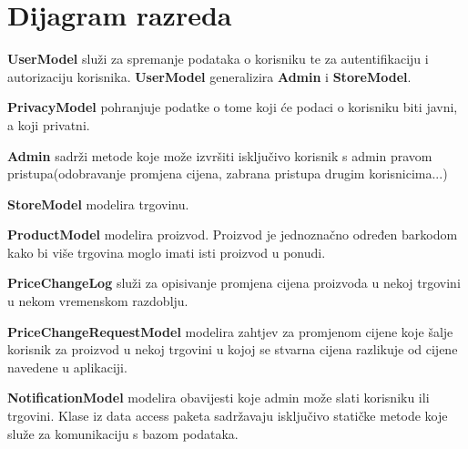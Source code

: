			\eject
			
			
		\section{Dijagram razreda}
		
			\textbf{UserModel} služi za spremanje podataka o korisniku te za autentifikaciju i autorizaciju korisnika. 
			\textbf{UserModel} generalizira \textbf{Admin} i \textbf{StoreModel}.
			 
			\textbf{PrivacyModel} pohranjuje podatke o tome koji će podaci o korisniku biti javni, a koji privatni.
			  
			\textbf{Admin} sadrži metode koje može izvršiti isključivo korisnik s admin pravom pristupa(odobravanje promjena cijena, zabrana pristupa drugim korisnicima...) 
			
			\textbf{StoreModel} modelira trgovinu. 
			
			\textbf{ProductModel} modelira proizvod. Proizvod je jednoznačno određen barkodom kako bi više trgovina moglo imati isti proizvod u ponudi. 
			
			\textbf{PriceChangeLog} služi za opisivanje promjena cijena proizvoda u nekoj trgovini u nekom vremenskom razdoblju. 
			
			\textbf{PriceChangeRequestModel} modelira zahtjev za promjenom cijene koje šalje korisnik za proizvod u nekoj trgovini u kojoj se stvarna cijena razlikuje od cijene navedene u aplikaciji.  
			
			\textbf{NotificationModel} modelira obavijesti koje admin može slati korisniku ili trgovini.
Klase iz data access paketa sadržavaju isključivo statičke metode koje služe za komunikaciju s bazom podataka.

